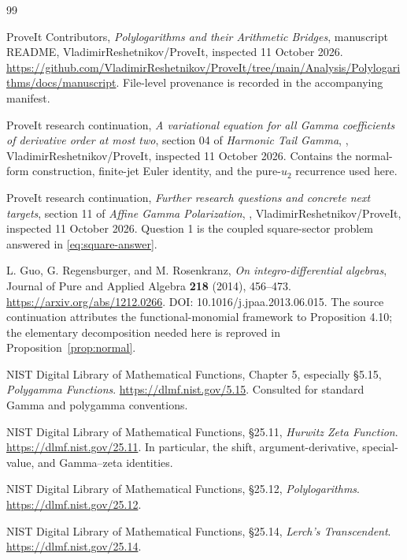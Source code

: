 \clearpage
\begingroup
\small\raggedright
\begin{thebibliography}{99}

ProveIt Contributors,
\emph{Polylogarithms and their Arithmetic Bridges}, manuscript README,
VladimirReshetnikov/ProveIt, inspected 11 October 2026.
\url{https://github.com/VladimirReshetnikov/ProveIt/tree/main/Analysis/Polylogarithms/docs/manuscript}.
File-level provenance is recorded in the accompanying manifest.

ProveIt research continuation,
\emph{A variational equation for all Gamma coefficients of derivative
order at most two}, section 04 of \emph{Harmonic Tail Gamma},
,
VladimirReshetnikov/ProveIt, inspected 11 October 2026.
Contains the normal-form construction, finite-jet Euler identity, and the
pure-$u_2$ recurrence used here.

ProveIt research continuation,
\emph{Further research questions and concrete next targets}, section 11
of \emph{Affine Gamma Polarization},
,
VladimirReshetnikov/ProveIt, inspected 11 October 2026.
Question 1 is the coupled square-sector problem answered in
\eqref{eq:square-answer}.

L. Guo, G. Regensburger, and M. Rosenkranz,
\emph{On integro-differential algebras},
Journal of Pure and Applied Algebra \textbf{218} (2014), 456--473.
\url{https://arxiv.org/abs/1212.0266}.
DOI: 10.1016/j.jpaa.2013.06.015.
The source continuation attributes the functional-monomial framework to
Proposition 4.10; the elementary decomposition needed here is reproved in
Proposition~\ref{prop:normal}.

NIST Digital Library of Mathematical Functions,
Chapter 5, especially \S5.15, \emph{Polygamma Functions}.
\url{https://dlmf.nist.gov/5.15}.
Consulted for standard Gamma and polygamma conventions.

NIST Digital Library of Mathematical Functions,
\S25.11, \emph{Hurwitz Zeta Function}.
\url{https://dlmf.nist.gov/25.11}.
In particular, the shift, argument-derivative, special-value, and
Gamma--zeta identities.

NIST Digital Library of Mathematical Functions,
\S25.12, \emph{Polylogarithms}.
\url{https://dlmf.nist.gov/25.12}.

NIST Digital Library of Mathematical Functions,
\S25.14, \emph{Lerch's Transcendent}.
\url{https://dlmf.nist.gov/25.14}.

\end{thebibliography}

\endgroup
